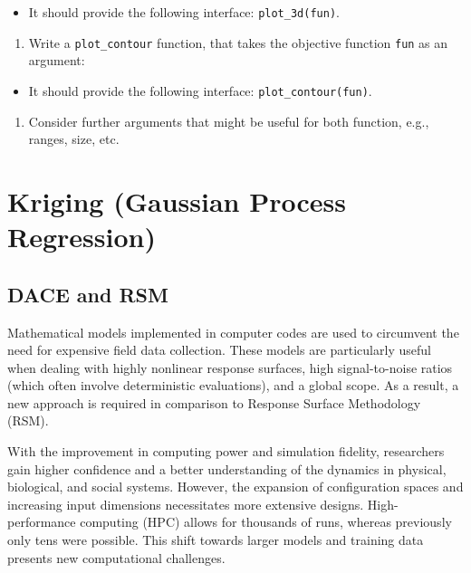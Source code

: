 \documentclass[
  letterpaper,
  DIV=11,
  numbers=noendperiod]{scrreprt}
\providecommand{\tightlist}{%
  \setlength{\itemsep}{0pt}\setlength{\parskip}{0pt}}\usepackage{longtable,booktabs,array}
\begin{document}
\begin{itemize}
\tightlist
\item
  It should provide the following interface: \texttt{plot\_3d(fun)}.
\end{itemize}

\begin{enumerate}
\def\labelenumi{\arabic{enumi}.}
\setcounter{enumi}{2}
\tightlist
\item
  Write a \texttt{plot\_contour} function, that takes the objective
  function \texttt{fun} as an argument:
\end{enumerate}

\begin{itemize}
\tightlist
\item
  It should provide the following interface:
  \texttt{plot\_contour(fun)}.
\end{itemize}

\begin{enumerate}
\def\labelenumi{\arabic{enumi}.}
\setcounter{enumi}{3}
\tightlist
\item
  Consider further arguments that might be useful for both function,
  e.g., ranges, size, etc.
\end{enumerate}

\hypertarget{kriging-gaussian-process-regression}{%
\chapter{Kriging (Gaussian Process
Regression)}\label{kriging-gaussian-process-regression}}

\hypertarget{dace-and-rsm}{%
\section{DACE and RSM}\label{dace-and-rsm}}

Mathematical models implemented in computer codes are used to circumvent
the need for expensive field data collection. These models are
particularly useful when dealing with highly nonlinear response
surfaces, high signal-to-noise ratios (which often involve deterministic
evaluations), and a global scope. As a result, a new approach is
required in comparison to Response Surface Methodology (RSM).

With the improvement in computing power and simulation fidelity,
researchers gain higher confidence and a better understanding of the
dynamics in physical, biological, and social systems. However, the
expansion of configuration spaces and increasing input dimensions
necessitates more extensive designs. High-performance computing (HPC)
allows for thousands of runs, whereas previously only tens were
possible. This shift towards larger models and training data presents
new computational challenges.
\end{document}
